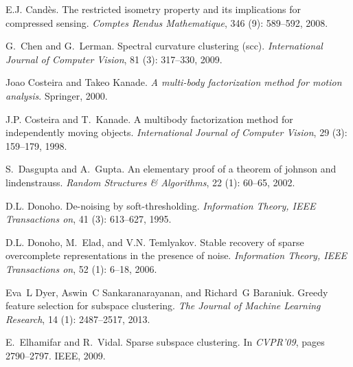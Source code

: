 \documentclass{ctexart}
\begin{document}
\begin{thebibliography}{47}
    E.J. Cand{\`e}s.
    \newblock The restricted isometry property and its implications for compressed
    sensing.
    \newblock \emph{Comptes Rendus Mathematique}, 346 (9):
    589--592, 2008.

    G.~Chen and G.~Lerman.
    \newblock Spectral curvature clustering (scc).
    \newblock \emph{International Journal of Computer Vision}, 81
    (3): 317--330, 2009.

    Joao Costeira and Takeo Kanade.
    \newblock \emph{A multi-body factorization method for motion analysis}.
    \newblock Springer, 2000.

    J.P. Costeira and T.~Kanade.
    \newblock A multibody factorization method for independently moving objects.
    \newblock \emph{International Journal of Computer Vision}, 29
    (3): 159--179, 1998.

    S.~Dasgupta and A.~Gupta.
    \newblock An elementary proof of a theorem of johnson and lindenstrauss.
    \newblock \emph{Random Structures \& Algorithms}, 22 (1):
    60--65, 2002.

    D.L. Donoho.
    \newblock De-noising by soft-thresholding.
    \newblock \emph{Information Theory, IEEE Transactions on}, 41
    (3): 613--627, 1995.

    D.L. Donoho, M.~Elad, and V.N. Temlyakov.
    \newblock Stable recovery of sparse overcomplete representations in the
    presence of noise.
    \newblock \emph{Information Theory, IEEE Transactions on}, 52
    (1): 6--18, 2006.

    Eva~L Dyer, Aswin~C Sankaranarayanan, and Richard~G Baraniuk.
    \newblock Greedy feature selection for subspace clustering.
    \newblock \emph{The Journal of Machine Learning Research}, 14
    (1): 2487--2517, 2013.

    E.~Elhamifar and R.~Vidal.
    \newblock Sparse subspace clustering.
    \newblock In \emph{CVPR'09}, pages 2790--2797. IEEE, 2009.


\end{thebibliography}
\end{document}
